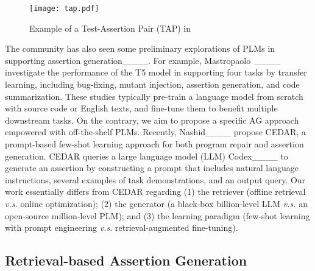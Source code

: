 \begin{figure}[t]
	\graphicspath{{figs/}}
	\centering
	\texttt{[image: tap.pdf]}
	\caption{Example of a Test-Assertion Pair (TAP) in \atla{}}
	\label{fig:tap}
\end{figure}

The community has also seen some preliminary explorations of PLMs in supporting assertion generation____.
For example, Mastropaolo~\etal____ investigate the performance of the T5 model in supporting four tasks by transfer learning, including bug-fixing, mutant injection, assertion generation, and code summarization.
These studies typically pre-train a language model from scratch with source code or English texts, and fine-tune them to benefit multiple downstream tasks.
On the contrary, we aim to propose a specific AG approach \toolname{} empowered with off-the-shelf PLMs.
Recently, Nashid____ propose CEDAR, a prompt-based few-shot learning approach for both program repair and assertion generation.
CEDAR queries a large language model (LLM) Codex____ to generate an assertion by constructing a prompt that includes natural language instructions, several examples of task demonstrations, and an output query.
Our work essentially differs from CEDAR regarding (1) the retriever (offline retrieval \textit{v.s.} online optimization); (2) the generator (a black-box billion-level LLM \textit{v.s.} an open-source million-level PLM); and (3) the learning paradigm (few-shot learning with prompt engineering \textit{v.s.} retrieval-augmented fine-tuning). 

\subsection{Retrieval-based Assertion Generation}


